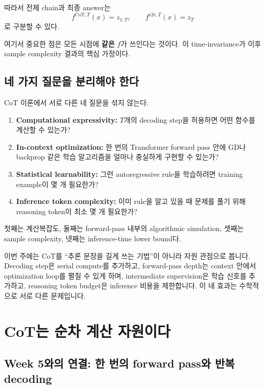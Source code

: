 \documentclass[11pt,a4paper,oneside,openany]{memoir}
\theoremstyle{definition}
\begin{document}
따라서 전체 chain과 최종 answer는
\[
f^{\mathrm{CoT},T}(x)
= z_{1:T},
\qquad
f^{\mathrm{e2e},T}(x)
= z_T
\]
로 구분할 수 있다.

여기서 중요한 점은 모든 시점에 \textbf{같은} $f$가 쓰인다는 것이다.
이 time-invariance가 이후 sample complexity 결과의 핵심 가정이다.

\section{네 가지 질문을 분리해야 한다}

\begin{keybox}
CoT 이론에서 서로 다른 네 질문을 섞지 않는다.
\begin{enumerate}
\item \textbf{Computational expressivity:} $T$개의 decoding step을 허용하면 어떤 함수를 계산할 수 있는가?
\item \textbf{In-context optimization:} 한 번의 Transformer forward pass 안에 GD나 backprop 같은 학습 알고리즘을 얼마나 충실하게 구현할 수 있는가?
\item \textbf{Statistical learnability:} 그런 autoregressive rule을 학습하려면 training example이 몇 개 필요한가?
\item \textbf{Inference token complexity:} 이미 rule을 알고 있을 때 문제를 풀기 위해 reasoning token이 최소 몇 개 필요한가?
\end{enumerate}
첫째는 계산복잡도, 둘째는 forward-pass 내부의 algorithmic simulation, 셋째는 sample complexity, 넷째는 inference-time lower bound다.
\end{keybox}

\begin{presentbox}
이번 주에는 CoT를 ``추론 문장을 길게 쓰는 기법''이 아니라 자원 관점으로 봅니다. Decoding step은 serial compute를 추가하고, forward-pass depth는 context 안에서 optimization loop를 펼칠 수 있게 하며, intermediate supervision은 학습 신호를 추가하고, reasoning token budget은 inference 비용을 제한합니다. 이 네 효과는 수학적으로 서로 다른 문제입니다.
\end{presentbox}

\chapter{CoT는 순차 계산 자원이다}

\section{Week 5와의 연결: 한 번의 forward pass와 반복 decoding}
\end{document}
